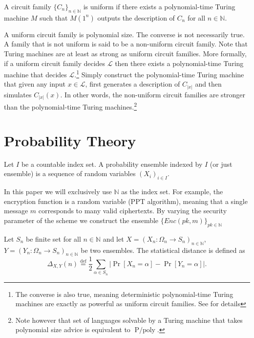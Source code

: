 \begin{definition}
A circuit family $\{C_n\}_{n \in \mathbb{N}}$ is uniform if there exists a polynomial-time Turing machine $M$ such that $M(1^n)$ outputs the description of $C_n$ for all $n\in \mathbb{N}$.
\end{definition}

A uniform circuit family is polynomial size. The converse is not necessarily true. A family that is not uniform is said to be a non-uniform circuit family. Note that Turing machines are at least as strong as uniform circuit families. More formally, if a uniform circuit family decides $\mathscr{L}$ then there exists a polynomial-time Turing machine that decides $\mathscr{L}$.\footnote{The converse is also true, meaning deterministic polynomial-time Turing machines are exactly as powerful as uniform circuit families. See \cite[pp. 111]{Arora} for details} Simply construct the polynomial-time Turing machine that given any input $x \in \mathscr{L}$, first generates a description of $C_{|x|}$ and then simulates $C_{|x|}(x)$. In other words, the non-uniform circuit families are stronger than the polynomial-time Turing machines.\footnote{Note however that set of languages solvable by a Turing machine that takes polynomial size advice is equivalent to $\operatorname{P/poly}$.}

\section{Probability Theory}


\begin{definition}
    Let $I$ be a countable index set. A probability ensemble indexed by $I$ (or just ensemble) is a sequence of random variables $(X_i)_{i \in I}$.
\end{definition}

In this paper we will exclusively use $\mathbb{N}$ as the index set.
For example, the encryption function is a random variable (PPT algorithm), meaning that a single message $m$ corresponds to many valid ciphertexts. By varying the security parameter of the scheme we construct the ensemble $\{Enc(pk,m)\}_{pk \in \mathbb{N}}$

\begin{definition}
    Let $S_n$ be finite set for all $n \in \mathbb{N}$ and let $X = (X_n \colon \Omega_n \to S_n)_{n \in \mathbb{N}}$, $Y = (Y_n \colon \Omega_n \to S_n)_{n \in \mathbb{N}}$ be two ensembles. The statistical distance is defined as
    \begin{equation*}
        \Delta_{X,Y}(n) \stackrel{\mathrm{def}}{=} \frac{1}{2} \sum_{\alpha \in S_n} |\operatorname{Pr}[X_n = \alpha] - \operatorname{Pr}[Y_n = \alpha]|.
    \end{equation*}
\end{definition}

